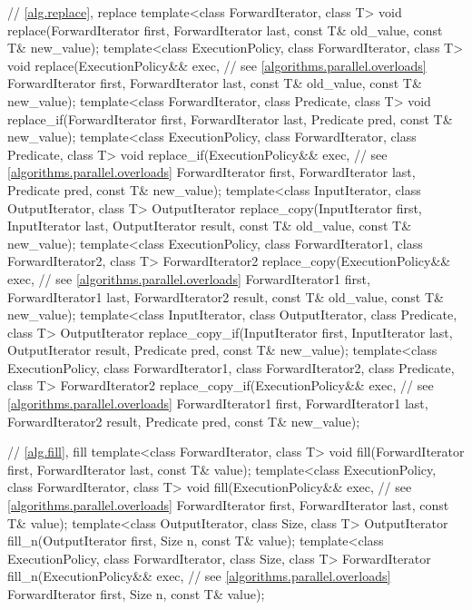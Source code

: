 \begin{codeblock}
{  // \ref{alg.replace}, replace
  template<class ForwardIterator, class T>
    void replace(ForwardIterator first, ForwardIterator last,
                 const T& old_value, const T& new_value);
  template<class ExecutionPolicy, class ForwardIterator, class T>
    void replace(ExecutionPolicy&& exec, // see \ref{algorithms.parallel.overloads}
                 ForwardIterator first, ForwardIterator last,
                 const T& old_value, const T& new_value);
  template<class ForwardIterator, class Predicate, class T>
    void replace_if(ForwardIterator first, ForwardIterator last,
                    Predicate pred, const T& new_value);
  template<class ExecutionPolicy, class ForwardIterator, class Predicate, class T>
    void replace_if(ExecutionPolicy&& exec, // see \ref{algorithms.parallel.overloads}
                    ForwardIterator first, ForwardIterator last,
                    Predicate pred, const T& new_value);
  template<class InputIterator, class OutputIterator, class T>
    OutputIterator replace_copy(InputIterator first, InputIterator last,
                                OutputIterator result,
                                const T& old_value, const T& new_value);
  template<class ExecutionPolicy, class ForwardIterator1, class ForwardIterator2, class T>
    ForwardIterator2 replace_copy(ExecutionPolicy&& exec, // see \ref{algorithms.parallel.overloads}
                                  ForwardIterator1 first, ForwardIterator1 last,
                                  ForwardIterator2 result,
                                  const T& old_value, const T& new_value);
  template<class InputIterator, class OutputIterator, class Predicate, class T>
    OutputIterator replace_copy_if(InputIterator first, InputIterator last,
                                   OutputIterator result,
                                   Predicate pred, const T& new_value);
  template<class ExecutionPolicy, class ForwardIterator1, class ForwardIterator2,
           class Predicate, class T>
    ForwardIterator2 replace_copy_if(ExecutionPolicy&& exec, // see \ref{algorithms.parallel.overloads}
                                     ForwardIterator1 first, ForwardIterator1 last,
                                     ForwardIterator2 result,
                                     Predicate pred, const T& new_value);

  // \ref{alg.fill}, fill
  template<class ForwardIterator, class T>
    void fill(ForwardIterator first, ForwardIterator last, const T& value);
  template<class ExecutionPolicy, class ForwardIterator,
           class T>
    void fill(ExecutionPolicy&& exec, // see \ref{algorithms.parallel.overloads}
              ForwardIterator first, ForwardIterator last, const T& value);
  template<class OutputIterator, class Size, class T>
    OutputIterator fill_n(OutputIterator first, Size n, const T& value);
  template<class ExecutionPolicy, class ForwardIterator,
           class Size, class T>
    ForwardIterator fill_n(ExecutionPolicy&& exec, // see \ref{algorithms.parallel.overloads}
                          ForwardIterator first, Size n, const T& value);

}
\end{codeblock}
